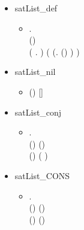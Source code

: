 \begin{itemize}
\item satList_def
  \begin{itemize}
    \item[] \HOLTokenTurnstile{} \HOLSymConst{\HOLTokenForall{}}   .\\\tab
     (\HOLSymConst{,}\HOLSymConst{,})   \HOLSymConst{\HOLTokenEquiv{}}\\\tab
      (\HOLTokenLambda{} .  \HOLSymConst{\HOLTokenConj{}} )  ( (\HOLTokenLambda{}. (\HOLSymConst{,}\HOLSymConst{,})  ) )
   \end{itemize}
   \item satList_nil
  \begin{itemize}
    \item[] \HOLTokenTurnstile{} (\HOLSymConst{,}\HOLSymConst{,})  []
    \end{itemize}
    \item satList_conj
  \begin{itemize}
    \item[] \HOLTokenTurnstile{} \HOLSymConst{\HOLTokenForall{}}    .\\\tab
     (\HOLSymConst{,}\HOLSymConst{,})   \HOLSymConst{\HOLTokenConj{}} (\HOLSymConst{,}\HOLSymConst{,})   \HOLSymConst{\HOLTokenEquiv{}}\\\tab
     (\HOLSymConst{,}\HOLSymConst{,})  ( \HOLSymConst{++} )
   \end{itemize}
   \item satList_CONS
  \begin{itemize}
    \item[] \HOLTokenTurnstile{} \HOLSymConst{\HOLTokenForall{}}    .\\\tab
     (\HOLSymConst{,}\HOLSymConst{,})  (\HOLSymConst{::}) \HOLSymConst{\HOLTokenEquiv{}}\\\tab (\HOLSymConst{,}\HOLSymConst{,})   \HOLSymConst{\HOLTokenConj{}} (\HOLSymConst{,}\HOLSymConst{,})  
    \end{itemize}
  \end{itemize}

